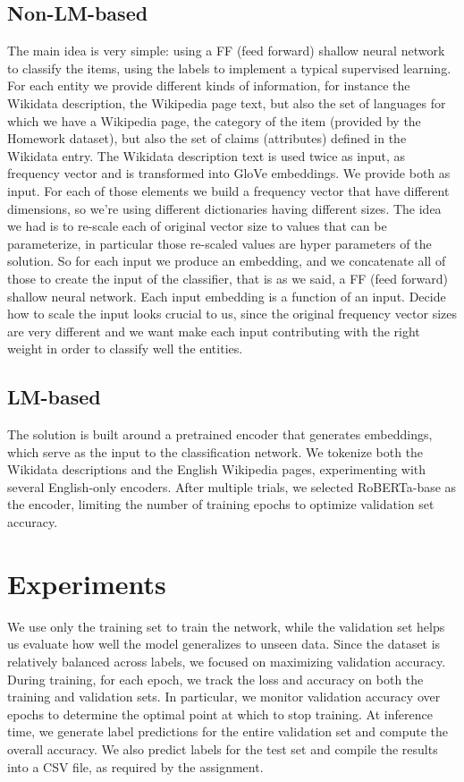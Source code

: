 \documentclass[11pt]{article}
\begin{document}
\subsection{Non-LM-based}
The main idea is very simple: using a FF (feed forward) shallow neural network to classify the items, using the labels to implement a typical supervised learning. For each entity we provide different kinds of information, for instance the Wikidata description, the Wikipedia page text, but also the set of languages for which we have a Wikipedia page, the category of the item (provided by the Homework dataset), but also the set of claims (attributes) defined in the Wikidata entry. The Wikidata description text is used twice as input, as frequency vector and is transformed into GloVe embeddings. We provide both as input.
For each of those elements we build a frequency vector that have different dimensions, so we're using different dictionaries having different sizes. The idea we had is to re-scale each of original vector size to values that can be parameterize, in particular those re-scaled values are hyper parameters of the solution. So for each input we produce an embedding, and we concatenate all of those to create the input of the classifier, that is as we said, a FF (feed forward) shallow neural network. Each input embedding is a function of an input. \newline Decide how to scale the input looks crucial to us, since the original frequency vector sizes are very different and we want make each input contributing with the right weight in order to classify well the entities. 
	
\subsection{LM-based}
The solution is built around a pretrained encoder that generates embeddings, which serve as the input to the classification network. We tokenize both the Wikidata descriptions and the English Wikipedia pages, experimenting with several English-only encoders. After multiple trials, we selected RoBERTa-base as the encoder, limiting the number of training epochs to optimize validation set accuracy.

\section{Experiments}
We use only the training set to train the network, while the validation set helps us evaluate how well the model generalizes to unseen data. Since the dataset is relatively balanced across labels, we focused on maximizing validation accuracy. \newline During training, for each epoch, we track the loss and accuracy on both the training and validation sets. In particular, we monitor validation accuracy over epochs to determine the optimal point at which to stop training. \newline At inference time, we generate label predictions for the entire validation set and compute the overall accuracy. We also predict labels for the test set and compile the results into a CSV file, as required by the assignment.
\end{document}
